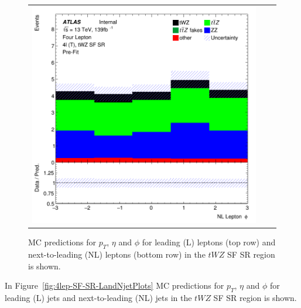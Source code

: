\begin{figure}[htbp]
\begin{tabular}{ccc}
    \includegraphics[width=.3\textwidth]{figures/PreFitPlots/lep4_tWZ_4T_SF_NL_lepton_phi.png} \\

  \end{tabular}
    \caption{MC predictions for $p_{T}$, $\eta$ and $\phi$ for leading (L) leptons (top row) and next-to-leading (NL) leptons (bottom row) in the $tWZ$ SF SR region  is shown.}
  \label{fig:4lep-SF-SR-leptonPlots}
\end{figure}

In Figure~\ref{fig:4lep-SF-SR-LandNjetPlots} MC predictions for $p_{T}$, $\eta$ and $\phi$ for leading (L) jets and next-to-leading (NL) jets in the $tWZ$ SF SR region is shown.

